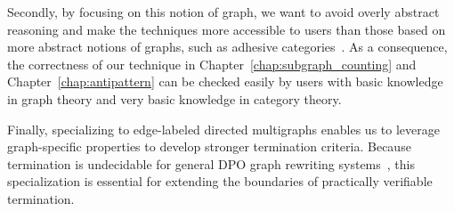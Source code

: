  Secondly, by focusing on this notion of graph, we want to avoid overly abstract reasoning and make the techniques more accessible to users than those based on more abstract notions of graphs, such as adhesive categories~\cite{lack2004adhesive}.
 As a consequence, the correctness of our technique in Chapter~\ref{chap:subgraph_counting} and Chapter~\ref{chap:antipattern} can be checked easily by users with basic knowledge in graph theory and very basic knowledge in category theory.

Finally, specializing to edge-labeled directed multigraphs enables us to leverage graph-specific properties to develop stronger termination criteria. Because termination is undecidable for general DPO graph rewriting systems~\cite{plump1998terminationundecidable}, this specialization is essential for extending the boundaries of practically verifiable termination. 

 

